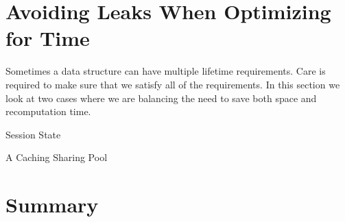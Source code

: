 \section{Avoiding Leaks When Optimizing for Time}
Sometimes a data structure can have multiple lifetime requirements. 
Care is required to make sure that we satisfy all of the requirements.  In this
section we look at two cases where we are balancing the need to save both space and recomputation
time.

\begin{example}{Session State}
\end{example}

\begin{example}{A Caching Sharing Pool}
\end{example}


\section{Summary}






